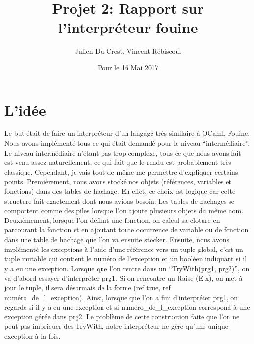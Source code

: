 \documentclass[10pt,a4paper]{article}
\title{Projet 2: Rapport sur l'interpréteur fouine}
\author{Julien Du Crest, Vincent Rébiscoul}
\date{Pour le 16 Mai 2017}
\begin{document}
\maketitle

\section{L'idée}
Le but était de faire un interpréteur d'un langage très similaire à OCaml, Fouine. Nous avons implémenté tous ce qui était demandé pour le niveau ``intermédiaire''. Le niveau intermédiaire n'étant pas trop complexe, tous ce que nous avons fait est venu assez naturellement, ce qui fait que le rendu est probablement très classique. Cependant, je vais tout de même me permettre d'expliquer certains points. Premièrement, nous avons stocké nos objets (références, variables et fonctions) dans des tables de hachage. En effet, ce choix est logique car cette structure fait exactement dont nous avions besoin. Les tables de hachages se comportent comme des piles lorsque l'on ajoute plusieurs objets du même nom. Deuxièmement, lorsque l'on définit une fonction, on calcul sa clôture en parcourant la fonction et en ajoutant toute occurrence de variable ou de fonction dans une table de hachage que l'on va ensuite stocker. Ensuite, nous avons implémenté les exceptions à l'aide d'une référence vers un tuple global, c'est un tuple mutable qui contient le numéro de l'exception et un booléen indiquant si il y a eu une exception. Lorsque que l'on rentre dans un ``TryWith(prg1, prg2)'', on va d'abord essayer d'interpréter prg1. Si on rencontre un Raise (E x), on met à jour le tuple, il sera désormais de la forme (ref true, ref numéro\_de\_l\_exception). Ainsi, lorsque que l'on a fini d'interpréter prg1, on regarde si il y a eu une exception et si numéro\_de\_l\_exception correspond à une exception gérée dans prg2. Le problème de cette construction faite que l'on ne peut pas imbriquer des TryWith, notre interpréteur ne gère qu'une unique exception à la fois. 
\end{document}
